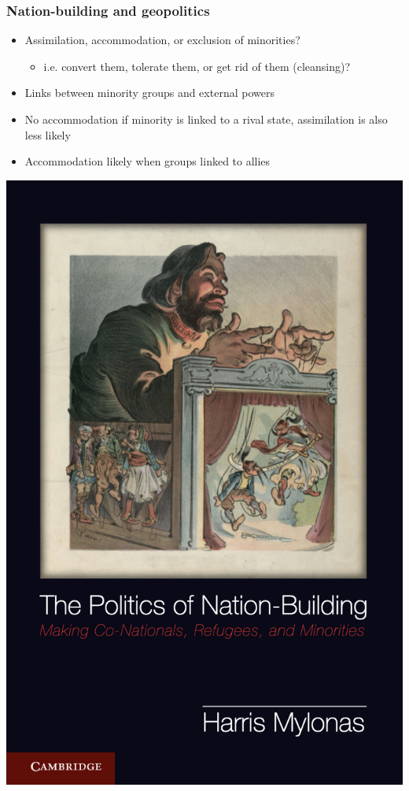 \documentclass[aspectratio=43, handout]{beamer}
\begin{document}
\begin{frame}
\frametitle{Nation-building and geopolitics}
\centering

\begin{minipage}{.49\textwidth}\centering
  \begin{itemize}
    \item Assimilation, accommodation, or exclusion of minorities?
    \begin{itemize}
      \item i.e. convert them, tolerate them, or get rid of them (cleansing)?
    \end{itemize}
    \item Links between minority groups and external powers
    \item No accommodation if minority is linked to a rival state, assimilation is also less likely
    \item Accommodation likely when groups linked to allies
  \end{itemize}
\end{minipage}\hfill
\begin{minipage}{.49\textwidth}\centering
    \includegraphics[width = .9\textwidth]{img/mylonas}
      
\end{minipage}
  

\end{frame}
  
\end{document}
